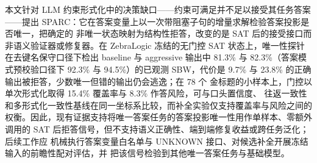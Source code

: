 \documentclass[letterpaper]{article}
\newcommand{\method}{SPARC}
\newcommand{\sbw}{SBW}
\begin{document}
本文针对 LLM 约束形式化中的决策缺口——约束可满足并不足以接受其任务答案——提出
\method{}：它在答案变量上以一次带阻塞子句的增量求解检验答案投影是否唯一，把确定的
非唯一状态映射为结构性拒答，改变的是 SAT 后的接受接口而非语义验证器或修复器。在
ZebraLogic 冻结的无门控 SAT 状态上，唯一性探针在去键名保守口径下检出 baseline 与
aggressive 输出中 81.3\% 与 82.3\%（答案模式预校验口径下 92.3\% 与 94.5\%）的已观测
\sbw{}，代价是 9.7\% 与 23.8\% 的正确输出被拒答，少数唯一但错的输出仍会逃逸；在 78 个
金标题的小样本上，门控以单次形式化取得 15.4\% 覆盖率与 8.3\% 作答风险，可与口头置信度、
往返一致性和多形式化一致性基线在同一坐标系比较，而补全实验仅支持覆盖率与风险之间的
权衡。因此，现有证据支持将唯一答案任务的答案投影唯一性用作单样本、零额外
调用的 SAT 后拒答信号，但不支持语义正确性、端到端修复收益或跨任务泛化；后续工作应
机械执行答案变量白名单与 UNKNOWN 接口、对候选补全开展冻结输入的前瞻性配对评估，并
把该信号检验到其他唯一答案任务与基础模型。
\end{document}
